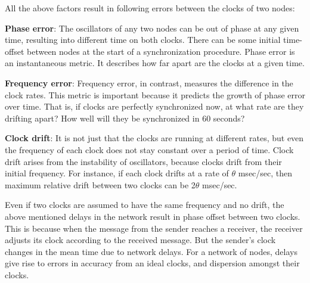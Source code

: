 \documentclass[a4paper,10pt]{report}
\begin{document}
      All the above factors result in following errors between the clocks of two nodes:
\begin{description}
\item \textbf{Phase error}: The oscillators of any two nodes can be out of phase at any given time, resulting into different time on both clocks. There can be some initial time-offset between nodes at the start of a synchronization procedure. Phase error is an instantaneous metric. It describes how far apart are the clocks at a given time.
\item \textbf{Frequency error}: Frequency error, in contrast, measures the difference in the clock rates. This metric is important because it predicts the growth of phase error over time. That is, if clocks are perfectly synchronized now, at what rate are they drifting apart? How well will they be synchronized in 60 seconds?
\item \textbf{Clock drift}: It is not just that the clocks are running at different rates, but even the frequency of each clock does not stay constant over a period of time. Clock drift arises from the instability of oscillators, because clocks drift from their initial frequency. For instance, if each clock drifts at a rate of $\theta$ msec/sec, then maximum relative drift between two clocks can be 2$\theta$ msec/sec.
\end{description}
Even if two clocks are assumed to have the same frequency and no drift, the above mentioned delays in the network result in phase
offset between two clocks. This is because when the message from the sender reaches a receiver, the receiver adjusts its clock according
to the received message. But the sender's clock changes in the mean time due to network delays. For a network of nodes, delays give rise
to errors in accuracy from an ideal clocks, and dispersion amongst their clocks.
\end{document}
